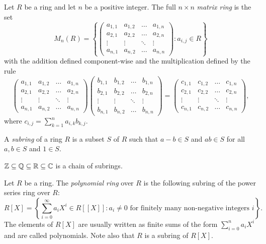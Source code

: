 \begin{example}	
Let $R$ be a ring and let $n$ be a positive integer. 
The full $n\times n$ {\em matrix ring} is the set
$$M_n(R)=\left\{\left(\begin{array}{cccc}
	a_{1,1}&a_{1,2}&\ldots&a_{1,n}\\
	a_{2,1}&a_{2,2}&\ldots&a_{2,n}\\
	\vdots&\vdots&\ddots&\vdots\\
	a_{n,1}&a_{n,2}&\ldots&a_{n,n}
	\end{array}\right): a_{i,j}\in R\right\}$$
with the addition defined component-wise and the multiplication defined by the rule
$$\left(\begin{array}{cccc}
	a_{1,1}&a_{1,2}&\ldots&a_{1,n}\\
	a_{2,1}&a_{2,2}&\ldots&a_{2,n}\\
	\vdots&\vdots&\ddots&\vdots\\
	a_{n,1}&a_{n,2}&\ldots&a_{n,n}
\end{array}\right)\left(\begin{array}{cccc}
b_{1,1}&b_{1,2}&\ldots&b_{1,n}\\
b_{2,1}&b_{2,2}&\ldots&b_{2,n}\\
\vdots&\vdots&\ddots&\vdots\\
b_{n,1}&b_{n,2}&\ldots&b_{n,n}
\end{array}\right)=\left(\begin{array}{cccc}
	c_{1,1}&c_{1,2}&\ldots&c_{1,n}\\
	c_{2,1}&c_{2,2}&\ldots&c_{2,n}\\
	\vdots&\vdots&\ddots&\vdots\\
	c_{n,1}&c_{n,2}&\ldots&c_{n,n}
\end{array}\right),$$
where $c_{i,j}=\sum_{k=1}^na_{i,k}b_{k,j}$.
\end{example}

A {\em subring} of a ring $R$ is a subset $S$ of $R$ such that
$a-b\in S$ and $ab\in S$ for all $a,b\in S$ 
and $1\in S$.


\begin{example}
    $\mathbb{Z}\subseteq\mathbb{Q}\subseteq\mathbb{R}\subseteq\mathbb{C}$ is a chain of subrings.
\end{example}

\begin{example}
	Let $R$ be a ring. The {\em polynomial ring} over $R$ is the following subring of the power series ring over $R$:
	\[
	R[X]=\left\{ \sum_{i=0}^{\infty}a_iX^{i}\in R[\![X]\!] : a_i\neq 0 \mbox{ for finitely many non-negative integers } i \right\}.
	\]
	The elements of $R[X]$ are usually written as finite sums of the 
	form $\sum_{i=0}^na_iX^{i}$ and are called polynomials. Note also that $R$ is a subring of $R[X]$.
\end{example}

